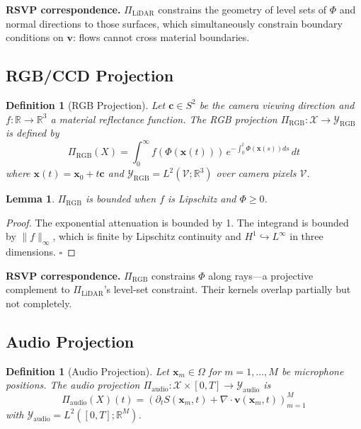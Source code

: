 \documentclass[12pt, oneside]{article}
\newtheorem{lemma}[theorem]{Lemma}
\newtheorem{definition}[theorem]{Definition}
\begin{document}
\textbf{RSVP correspondence.} $\Pi_{\mathrm{LiDAR}}$ constrains the geometry of level
sets of $\Phi$ and normal directions to those surfaces, which simultaneously constrain
boundary conditions on $\mathbf{v}$: flows cannot cross material boundaries.

\subsection{RGB/CCD Projection}

\begin{definition}[RGB Projection]
Let $\mathbf{c} \in S^2$ be the camera viewing direction and $f : \mathbb{R} \to \mathbb{R}^3$
a material reflectance function. The RGB projection
$\Pi_{\mathrm{RGB}} : \mathcal{X} \to \mathcal{Y}_{\mathrm{RGB}}$ is defined by
\[
\Pi_{\mathrm{RGB}}(X) = \int_0^\infty f(\Phi(\mathbf{x}(t)))\,
e^{-\int_0^t \Phi(\mathbf{x}(s)) ds}\, dt
\]
where $\mathbf{x}(t) = \mathbf{x}_0 + t\mathbf{c}$ and
$\mathcal{Y}_{\mathrm{RGB}} = L^2(\mathcal{V};\mathbb{R}^3)$ over camera pixels $\mathcal{V}$.
\end{definition}

\begin{lemma}
$\Pi_{\mathrm{RGB}}$ is bounded when $f$ is Lipschitz and $\Phi \ge 0$.
\end{lemma}
\begin{proof}
The exponential attenuation is bounded by 1. The integrand is bounded by $\|f\|_\infty$,
which is finite by Lipschitz continuity and $H^1 \hookrightarrow L^\infty$ in three
dimensions. $\square$
\end{proof}

\textbf{RSVP correspondence.} $\Pi_{\mathrm{RGB}}$ constrains $\Phi$ along rays---a
projective complement to $\Pi_{\mathrm{LiDAR}}$'s level-set constraint. Their kernels
overlap partially but not completely.

\subsection{Audio Projection}

\begin{definition}[Audio Projection]
Let $\mathbf{x}_m \in \Omega$ for $m = 1,\ldots,M$ be microphone positions. The audio
projection $\Pi_{\mathrm{audio}} : \mathcal{X} \times [0,T] \to \mathcal{Y}_{\mathrm{audio}}$
is
\[
\Pi_{\mathrm{audio}}(X)(t) =
\left( \partial_t S(\mathbf{x}_m, t) + \nabla \cdot \mathbf{v}(\mathbf{x}_m, t)
\right)_{m=1}^M
\]
with $\mathcal{Y}_{\mathrm{audio}} = L^2([0,T];\mathbb{R}^M)$.
\end{definition}
\end{document}
